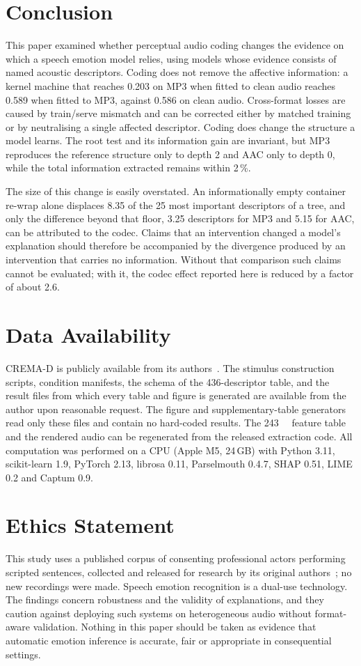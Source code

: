 \documentclass[lettersize,journal]{IEEEtran}
\begin{document}
\section{Conclusion}
This paper examined whether perceptual audio coding changes the evidence on
which a speech emotion model relies, using models whose evidence consists of
named acoustic descriptors. Coding does not remove the affective information: a
kernel machine that reaches 0.203 on MP3 when fitted to clean audio reaches
0.589 when fitted to MP3, against 0.586 on clean audio. Cross-format losses are
caused by train/serve mismatch and can be corrected either by matched training
or by neutralising a single affected descriptor. Coding does change the
structure a model learns. The root test and its information gain are invariant,
but MP3 reproduces the reference structure only to depth 2 and AAC only to
depth 0, while the total information extracted remains within 2\,\%.

The size of this change is easily overstated. An informationally empty
container re-wrap alone displaces 8.35 of the 25 most important descriptors of a
tree, and only the difference beyond that floor, 3.25 descriptors for MP3 and
5.15 for AAC, can be attributed to the codec. Claims that an intervention
changed a model's explanation should therefore be accompanied by the divergence
produced by an intervention that carries no information. Without that
comparison such claims cannot be evaluated; with it, the codec effect reported
here is reduced by a factor of about 2.6.

\section*{Data Availability}
CREMA-D is publicly available from its authors~\cite{cao2014cremad}. The
stimulus construction scripts, condition manifests, the schema of the
436-descriptor table, and the result files from which every table and figure is
generated are available from the author upon reasonable request. The figure and supplementary-table
generators read only these files and contain no hard-coded results. The
\SI{243}{\mega\byte} feature table and the rendered audio can be regenerated
from the released extraction code. All computation was performed on a CPU
(Apple M5, 24\,GB) with Python 3.11, scikit-learn 1.9, PyTorch 2.13, librosa
0.11, Parselmouth 0.4.7, SHAP 0.51, LIME 0.2 and Captum 0.9.

\section*{Ethics Statement}
This study uses a published corpus of consenting professional actors performing
scripted sentences, collected and released for research by its original
authors~\cite{cao2014cremad}; no new recordings were made. Speech emotion
recognition is a dual-use technology. The findings concern robustness and the
validity of explanations, and they caution against deploying such systems on
heterogeneous audio without format-aware validation. Nothing in this paper
should be taken as evidence that automatic emotion inference is accurate, fair
or appropriate in consequential settings.
\end{document}
